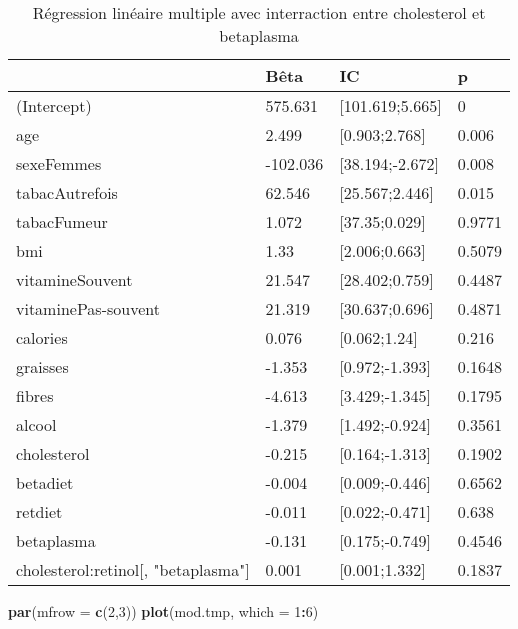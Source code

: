 \documentclass[]{article}
\newenvironment{Shaded}{\begin{snugshade}}{\end{snugshade}}
\newcommand{\KeywordTok}[1]{\textcolor[rgb]{0.13,0.29,0.53}{\textbf{#1}}}
\newcommand{\DataTypeTok}[1]{\textcolor[rgb]{0.13,0.29,0.53}{#1}}
\newcommand{\DecValTok}[1]{\textcolor[rgb]{0.00,0.00,0.81}{#1}}
\newcommand{\OperatorTok}[1]{\textcolor[rgb]{0.81,0.36,0.00}{\textbf{#1}}}
\newcommand{\NormalTok}[1]{#1}
\begin{document}
\begin{table}

\caption{\label{tab:unnamed-chunk-78}Régression linéaire multiple avec interraction entre cholesterol et betaplasma}
\centering
\begin{tabular}[t]{l|l|l|l}
\hline
  & Bêta & IC & p\\
\hline
\rowcolor[HTML]{BBD2E1}  (Intercept) & 575.631 & [101.619;5.665] & 0\\
\hline
age & 2.499 & [0.903;2.768] & 0.006\\
\hline
\rowcolor[HTML]{BBD2E1}  sexeFemmes & -102.036 & [38.194;-2.672] & 0.008\\
\hline
tabacAutrefois & 62.546 & [25.567;2.446] & 0.015\\
\hline
\rowcolor[HTML]{BBD2E1}  tabacFumeur & 1.072 & [37.35;0.029] & 0.9771\\
\hline
bmi & 1.33 & [2.006;0.663] & 0.5079\\
\hline
\rowcolor[HTML]{BBD2E1}  vitamineSouvent & 21.547 & [28.402;0.759] & 0.4487\\
\hline
vitaminePas-souvent & 21.319 & [30.637;0.696] & 0.4871\\
\hline
\rowcolor[HTML]{BBD2E1}  calories & 0.076 & [0.062;1.24] & 0.216\\
\hline
graisses & -1.353 & [0.972;-1.393] & 0.1648\\
\hline
\rowcolor[HTML]{BBD2E1}  fibres & -4.613 & [3.429;-1.345] & 0.1795\\
\hline
alcool & -1.379 & [1.492;-0.924] & 0.3561\\
\hline
\rowcolor[HTML]{BBD2E1}  cholesterol & -0.215 & [0.164;-1.313] & 0.1902\\
\hline
betadiet & -0.004 & [0.009;-0.446] & 0.6562\\
\hline
\rowcolor[HTML]{BBD2E1}  retdiet & -0.011 & [0.022;-0.471] & 0.638\\
\hline
betaplasma & -0.131 & [0.175;-0.749] & 0.4546\\
\hline
\rowcolor[HTML]{BBD2E1}  cholesterol:retinol[, "betaplasma"] & 0.001 & [0.001;1.332] & 0.1837\\
\hline
\end{tabular}
\end{table}

\begin{Shaded}
\begin{Highlighting}[]
\KeywordTok{par}\NormalTok{(}\DataTypeTok{mfrow =} \KeywordTok{c}\NormalTok{(}\DecValTok{2}\NormalTok{,}\DecValTok{3}\NormalTok{))}
\KeywordTok{plot}\NormalTok{(mod.tmp, }\DataTypeTok{which =} \DecValTok{1}\OperatorTok{:}\DecValTok{6}\NormalTok{)}
\end{Highlighting}
\end{Shaded}
\end{document}
